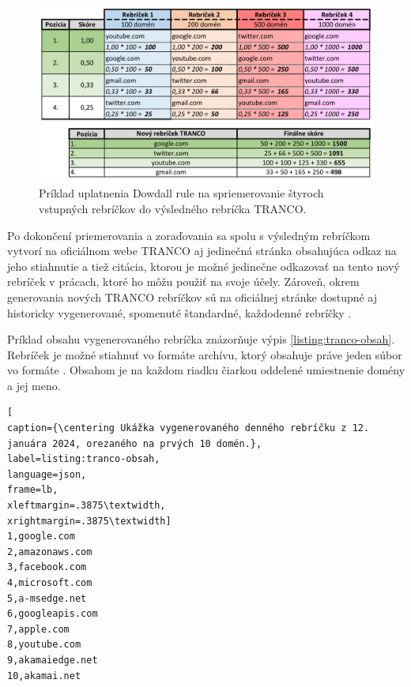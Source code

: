 \begin{figure}[htb]
\begin{center}
 \includegraphics[scale=0.84]{obrazky-figures/dowdall_rule_size_fit_cropped.pdf}
 \caption{\centering Príklad uplatnenia Dowdall rule na spriemerovanie štyroch vstupných rebríčkov do výsledného rebríčka TRANCO.}
 \label{img:dowdall-rule}
\end{center}
\end{figure}

\pagebreak

Po dokončení priemerovania a zoraďovania sa spolu s výsledným rebríčkom vytvorí na oficiálnom webe TRANCO aj jedinečná stránka obsahujúca odkaz na jeho stiahnutie a tiež citácia, 
ktorou je možné jedinečne odkazovať na tento nový rebríček v prácach, ktoré ho môžu použiť na svoje účely.
Zároveň, okrem generovania nových TRANCO rebríčkov sú na oficiálnej stránke dostupné aj historicky vygenerované, spomenuté štandardné, každodenné rebríčky \cite{tranco-homepage}.

Príklad obsahu vygenerovaného rebríčka znázorňuje výpis \ref{listing:tranco-obsah}.
Rebríček je možné stiahnuť vo formáte  archívu, ktorý obsahuje práve jeden súbor vo formáte . 
Obsahom je na každom riadku čiarkou oddelené umiestnenie domény a jej meno.

\begin{center}
\centering
\begin{lstlisting}[
caption={\centering Ukážka vygenerovaného denného rebríčku z 12. januára 2024, orezaného na prvých 10 domén.},
label=listing:tranco-obsah, 
language=json, 
frame=lb,
xleftmargin=.3875\textwidth, 
xrightmargin=.3875\textwidth]
1,google.com
2,amazonaws.com
3,facebook.com
4,microsoft.com
5,a-msedge.net
6,googleapis.com
7,apple.com
8,youtube.com
9,akamaiedge.net
10,akamai.net

\end{lstlisting}
\end{center}

